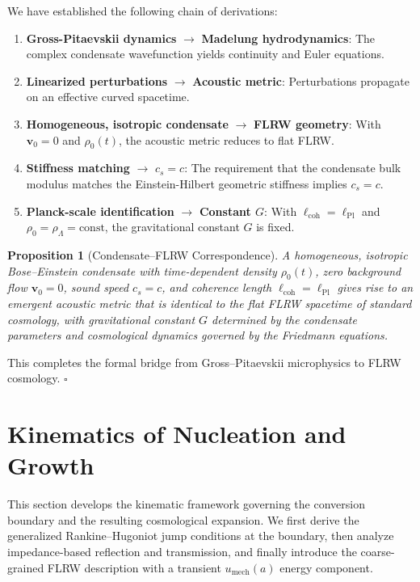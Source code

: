 \documentclass[11pt,a4paper]{article}
\newcommand{\umech}{u_{\mathrm{mech}}}
\newtheorem{proposition}{Proposition}
\theoremstyle{definition}
\begin{document}
We have established the following chain of derivations:
\begin{enumerate}[leftmargin=2.2em]
    \item \textbf{Gross-Pitaevskii dynamics} $\to$ \textbf{Madelung hydrodynamics}: The complex condensate wavefunction yields continuity and Euler equations.
    \item \textbf{Linearized perturbations} $\to$ \textbf{Acoustic metric}: Perturbations propagate on an effective curved spacetime.
    \item \textbf{Homogeneous, isotropic condensate} $\to$ \textbf{FLRW geometry}: With $\mathbf{v}_0 = 0$ and $\rho_0(t)$, the acoustic metric reduces to flat FLRW.
    \item \textbf{Stiffness matching} $\to$ \textbf{$c_s = c$}: The requirement that the condensate bulk modulus matches the Einstein-Hilbert geometric stiffness implies $c_s = c$.
    \item \textbf{Planck-scale identification} $\to$ \textbf{Constant $G$}: With $\ell_{\mathrm{coh}} = \ell_{\mathrm{Pl}}$ and $\rho_0 = \rho_\Lambda = \text{const}$, the gravitational constant $G$ is fixed.
\end{enumerate}

\begin{proposition}[Condensate--FLRW Correspondence]
\label{prop:correspondence}
A homogeneous, isotropic Bose--Einstein condensate with time-dependent density $\rho_0(t)$, zero background flow $\mathbf{v}_0 = 0$, sound speed $c_s = c$, and coherence length $\ell_{\mathrm{coh}} = \ell_{\mathrm{Pl}}$ gives rise to an emergent acoustic metric that is identical to the flat FLRW spacetime of standard cosmology, with gravitational constant $G$ determined by the condensate parameters and cosmological dynamics governed by the Friedmann equations.
\end{proposition}

This completes the formal bridge from Gross--Pitaevskii microphysics to FLRW cosmology. \hfill $\square$

\section{Kinematics of Nucleation and Growth}
\label{sec:kinematics}

This section develops the kinematic framework governing the conversion boundary and the resulting cosmological expansion. We first derive the generalized Rankine--Hugoniot jump conditions at the boundary, then analyze impedance-based reflection and transmission, and finally introduce the coarse-grained FLRW description with a transient $\umech(a)$ energy component.
\end{document}
